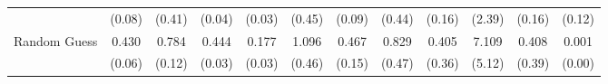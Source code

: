 \begin{table}[ht]
{\begin{tabular}{l cccc cccc cc c}
                                    & (0.08)                                          & (0.41)                                       & (0.04)                                        & (0.03)                  & (0.45)           & (0.09)        & (0.44)      & (0.16)       & (2.39)          & (0.16)       & (0.12)            \\
            \addlinespace[0.2em]
            Random Guess            & 0.430                                           & 0.784                                        & 0.444                                         & 0.177                   & 1.096            & 0.467         & 0.829       & 0.405        & 7.109           & 0.408        & 0.001             \\
                                    & (0.06)                                          & (0.12)                                       & (0.03)                                        & (0.03)                  & (0.46)           & (0.15)        & (0.47)      & (0.36)       & (5.12)          & (0.39)       & (0.00)            \\
            \bottomrule
        \end{tabular}%
    }
\end{table}